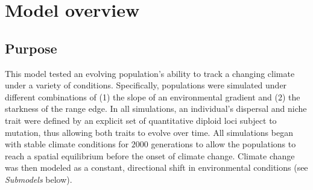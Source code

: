 \documentclass[11pt]{article}
\begin{document}




\renewcommand{\theequation}{A\arabic{equation}}
\renewcommand{\thetable}{A\arabic{table}}
\setcounter{equation}{0}  %
\setcounter{figure}{0}
\setcounter{table}{0}

\section*{Model overview}
\subsection*{Purpose} 
This model tested an evolving population's ability to track a changing climate under a variety of conditions. Specifically, populations were simulated under different combinations of (1) the slope of an environmental gradient and (2) the starkness of the range edge. In all simulations, an individual's dispersal and niche trait were defined by an explicit set of quantitative diploid loci subject to mutation, thus allowing both traits to evolve over time. All simulations began with stable climate conditions for $2000$ generations to allow the populations to reach a spatial equilibrium before the onset of climate change. Climate change was then modeled as a constant, directional shift in environmental conditions (see \textit{Submodels} below). 
\end{document}
